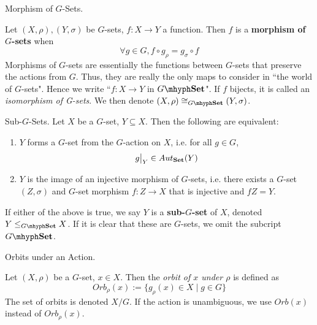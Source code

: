 \documentclass[../book.tex]{subfiles}
\begin{document}
\begin{dfn} Morphism of $G$-Sets. 

    Let $(X,\rho), (Y,\sigma)$ be $G$-sets, $f : X \to Y$ a function. 
    Then $f$ is a \textbf{morphism of $G$-sets} when
    \[
        \forall g \in G, f \circ g_\rho = g_\sigma \circ f
    \]
    Morphisms of $G$-sets are essentially 
    the functions between $G$-sets that preserve the actions from $G$. 
    Thus, they are really the only maps to consider in ``the world of $G$-sets".
    Hence we write ``$f : X \to Y$ in $G\mhyph\Set$". 
    If $f$ bijects, it is called an \emph{isomorphism of G-sets}. 
    We then denote $(X,\rho) \iso_{G\mhyph\Set} (Y,\sigma)$. 
    
\end{dfn}


\begin{dfn} Sub-$G$-Sets.
    Let $X$ be a $G$-set, $Y \subseteq X$. 
    Then the following are equivalent: 
    \begin{enumerate}
        \item $Y$ forms a $G$-set from the $G$-action on $X$, 
        i.e. for all $g \in G$, \[\res{g}{Y} \in Aut_\Set(Y)\]
        \item $Y$ is the image of an injective morphism of $G$-sets, 
        i.e. there exists a $G$-set $(Z,\sigma)$ and $G$-set morphism $f : Z \to X$
        that is injective and $fZ = Y$. 
    \end{enumerate}
    If either of the above is true, 
    we say $Y$ is a \textbf{sub-$G$-set} of $X$,
    denoted $Y \leq_{G\mhyph\Set} X$. 
    If it is clear that these are $G$-sets, 
    we omit the subcript $G\mhyph\Set$.
    
\end{dfn}

\begin{dfn} Orbits under an Action. 

    Let $(X, \rho)$ be a $G$-set, $x \in X$. 
    Then the \emph{orbit of $x$ under $\rho$} is defined as
    \[
        Orb_\rho(x) := \{g_\rho(x) \in X \mid g \in G\}
    \]
    The set of orbits is denoted $X / G$.
    If the action is unambiguous, we use $Orb(x)$ instead of $Orb_\rho(x)$. 

\end{dfn}
\end{document}
